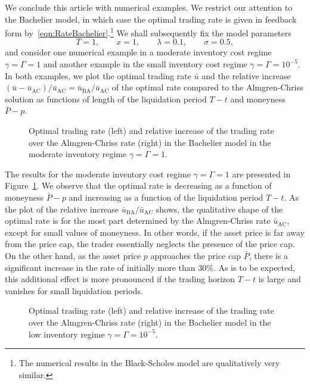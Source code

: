 \documentclass[11pt]{article}
\newlength\figheight
\newlength\figwidth
\theoremstyle{definition}
\theoremstyle{remark}
\begin{document}
We conclude this article with numerical examples. We restrict our attention to the Bachelier model, in which case the optimal trading rate is given in feedback form by~\eqref{eqn:RateBachelier}.\footnote{The numerical results in the Black-Scholes model are qualitatively very similar.} We shall subsequently fix the model parameters
\[
 T = 1,\qquad x = 1,\qquad \lambda = 0.1,\qquad \sigma = 0.5,
\]
and consider one numerical example in a moderate inventory cost regime $\gamma = \Gamma = 1$ and another example in the small inventory cost regime $\gamma = \Gamma = 10^{-5}$. In both examples, we plot the optimal trading rate $\bar u$ and the relative increase $(\bar u - \bar u_{\mathrm{AC}}) / \bar u_{\mathrm{AC}}= \bar u_{\mathrm{BA}} / \bar u_{\mathrm{AC}}$ of the optimal rate compared to the Almgren-Chriss solution as functions of length of the liquidation period $T-t$ and moneyness $\bar P - p$.

\begin{figure}[ht]
 \setlength{}
 \setlength{}
 \centering
 \hspace{0.5em}
 
 \caption{Optimal trading rate (left) and relative increase of the trading rate over the Almgren-Chriss rate (right) in the Bachelier model in the moderate inventory regime $\gamma = \Gamma = 1$.}
 \label{fig:Bachelier:moderate}
\end{figure}

The results for the moderate inventory cost regime $\gamma = \Gamma = 1$ are presented in Figure~\ref{fig:Bachelier:moderate}. We observe that the optimal rate is decreasing as a function of moneyness $\bar P-p$ and increasing as a function of the liquidation period $T-t$. As the plot of the relative increase $\bar u_{\mathrm{BA}} / \bar u_{\mathrm{AC}}$ shows, the qualitative shape of the optimal rate is for the most part determined by the Almgren-Chriss rate $\bar u_{\mathrm{AC}}$, except for small values of moneyness. In other words, if the asset price is far away from the price cap, the trader essentially neglects the presence of the price cap. On the other hand, as the asset price $p$ approaches the price cap $\bar P$, there is a significant increase in the rate of initially more than 30\%. As is to be expected, this additional effect is more pronounced if the trading horizon $T-t$ is large and vanishes for small liquidation periods.


\begin{figure}[ht]
 \setlength{}
 \setlength{}
 \centering
 \hspace{0.5em}
 
 \caption{Optimal trading rate (left) and relative increase of the trading rate over the Almgren-Chriss rate (right) in the Bachelier model in the low inventory regime $\gamma = \Gamma = 10^{-5}$.}
 \label{fig:Bachelier:low}
\end{figure}
\end{document}
